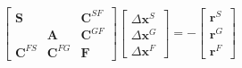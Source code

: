 \documentclass[border=2]{standalone}
\begin{document}
$
\left[
\begin{matrix}
\mathbf{S} & ~ & \mathbf{C}^{SF}\\
~ & \mathbf{A} ~ & \mathbf{C}^{GF}\\
\mathbf{C}^{FS} & \mathbf{C}^{FG} & \mathbf{F}
\end{matrix}
\right]
\left[
\begin{matrix}
\Delta\mathbf{x}^S\\
\Delta\mathbf{x}^G\\
\Delta\mathbf{x}^F
\end{matrix}
\right]
=-\left[
\begin{matrix}
\mathbf{r}^S\\
\mathbf{r}^G\\
\mathbf{r}^F
\end{matrix}
\right]
$
\end{document}
